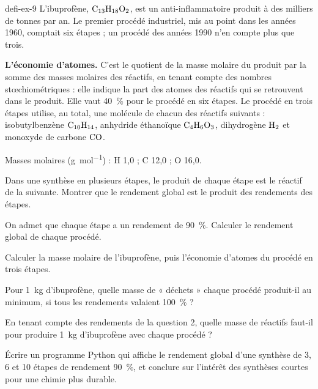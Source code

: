 \begin{blocEdition}{defi-ex-9}
L'ibuprofène, $\ce{C13H18O2}$, est un anti-inflammatoire produit à des milliers de tonnes par an. Le premier procédé industriel,
mis au point dans les années 1960, comptait six étapes ; un procédé des années 1990 n'en compte plus que trois.
\par\smallskip\noindent\textbf{L'économie d'atomes.} C'est le quotient de la masse molaire du produit par la somme des masses molaires
des réactifs, en tenant compte des nombres stœchiométriques : elle indique la part des atomes des réactifs qui se
retrouvent dans le produit. Elle vaut \qty{40}{\percent} pour le procédé en six étapes. Le procédé en trois étapes utilise, au total,
une molécule de chacun des réactifs suivants : isobutylbenzène $\ce{C10H14}$, anhydride éthanoïque $\ce{C4H6O3}$, dihydrogène $\ce{H2}$ et
monoxyde de carbone $\ce{CO}$.
\par\smallskip\noindent Masses molaires (\unit{g.mol^{-1}}) : H 1,0 ; C 12,0 ; O 16,0.
\begin{questions}
\item Dans une synthèse en plusieurs étapes, le produit de chaque étape est le réactif de la suivante. Montrer que le
rendement global est le produit des rendements des étapes.
\item On admet que chaque étape a un rendement de \qty{90}{\percent}. Calculer le rendement global de chaque procédé.
\item Calculer la masse molaire de l'ibuprofène, puis l'économie d'atomes du procédé en trois étapes.
\item Pour \qty{1}{kg} d'ibuprofène, quelle masse de « déchets » chaque procédé produit-il au minimum, si tous les rendements
valaient \qty{100}{\percent} ?
\item En tenant compte des rendements de la question 2, quelle masse de réactifs faut-il pour produire \qty{1}{kg} d'ibuprofène
avec chaque procédé ?
\item Écrire un programme Python qui affiche le rendement global d'une synthèse de 3, 6 et 10 étapes de rendement
\qty{90}{\percent}, et conclure sur l'intérêt des synthèses courtes pour une chimie plus durable.
\end{questions}
\end{blocEdition}

